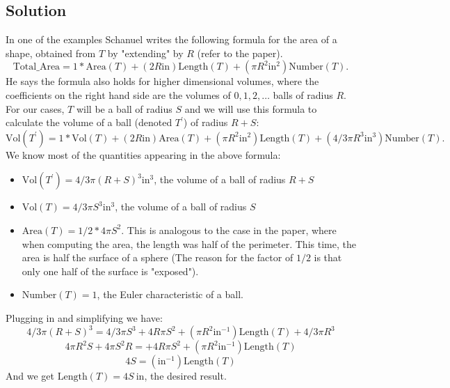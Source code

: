 \documentclass{article}
\begin{document}
\subsection*{Solution}
In one of the examples Schanuel writes the following formula for the area of a shape, obtained from $T$ by "{}extending"{} by $R$ (refer to the paper).
\begin{equation*}
\mathrm{Total\_Area} = 1 * \mathrm{Area}(T) + (2R\mathrm{in}) \mathrm{Length} (T) + (\pi R^2 \mathrm{in}^2) \mathrm{Number}(T).
\end{equation*}
He says the formula also holds for higher dimensional volumes, where the coefficients on the right hand side are the volumes of $0,1,2, \dots$ balls of radius $R$.
For our cases, $T$ will be a ball of radius $S$ and we will use this formula to calculate the volume of a ball (denoted $T^\prime$) of radius $R+S$:
\begin{equation*}
\mathrm{Vol}(T^\prime) = 1 * \mathrm{Vol}(T) + (2R\mathrm{in}) \mathrm{Area} (T) + (\pi R^2 \mathrm{in}^2) \mathrm{Length}(T) + (4/3 \pi R^3 \mathrm{in}^3) \mathrm{Number}(T).
\end{equation*}
We know most of the quantities appearing in the above formula:
\begin{itemize}
\item $\mathrm{Vol}(T^\prime) = 4/3 \pi (R+S)^3 \mathrm{in}^3$, the volume of a ball of radius $R+S$
\item $\mathrm{Vol}(T) = 4/3 \pi S^3 \mathrm{in}^3$, the volume of a ball of radius $S$
\item $\mathrm{Area}(T) = 1/2 * 4 \pi S^2$. This is analogous to the case in the paper, where when computing the area, the length was half of the perimeter. This time, the area is half the surface of a sphere (The reason for the factor of $1/2$ is that only one half of the surface is "{}exposed"{}).
\item $\mathrm{Number}(T) = 1$, the Euler characteristic of a ball.
\end{itemize}
Plugging in and simplifying we have:
\begin{equation*}
4/3 \pi (R+S)^3 = 4/3 \pi S^3 + 4R\pi S^2  + (\pi R^2 \mathrm{in}^{-1}) \mathrm{Length}(T) + 4/3 \pi R^3
\end{equation*}
\begin{equation*}
4\pi R^2 S + 4\pi S^2 R= + 4R\pi S^2  + (\pi R^2 \mathrm{in}^{-1}) \mathrm{Length}(T) 
\end{equation*}
\begin{equation*}
4 S =  ( \mathrm{in}^{-1}) \mathrm{Length}(T)
\end{equation*}
And we get $\mathrm{Length}(T) = 4S \ \mathrm{in}$, the desired result.
\newpage
\end{document}
